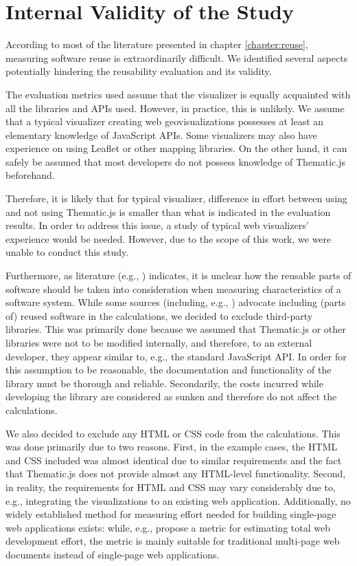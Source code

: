 \section{Internal Validity of the Study}
\label{section:internalvalidity}

According to most of the literature presented in chapter \ref{chapter:reuse}, measuring software reuse is extraordinarily difficult. We identified several aspects potentially hindering the reusability evaluation and its validity.

The evaluation metrics used assume that the visualizer is equally acquainted with all the libraries and APIs used. However, in practice, this is unlikely. We assume that a typical visualizer creating web geovisualizations possesses at least an elementary knowledge of JavaScript APIs. Some visualizers may also have experience on using Leaflet or other mapping libraries. On the other hand, it can safely be assumed that most developers do not possess knowledge of Thematic.js beforehand. 

Therefore, it is likely that for typical visualizer, difference in effort between using and not using Thematic.js is smaller than what is indicated in the evaluation results. In order to address this issue, a study of typical web visualizers' experience would be needed. However, due to the scope of this work, we were unable to conduct this study.

Furthermore, as literature (e.g., \citealt{frakes_success_1994,mohagheghi_quality_2007}) indicates, it is unclear how the reusable parts of software should be taken into consideration when measuring characteristics of a software system. While some sources (including, e.g., \citealt{frakes_software_1996,selby_enabling_2005}) advocate including (parts of) reused software in the calculations, we decided to exclude third-party libraries. This was primarily done because we assumed that Thematic.js or other libraries were not to be modified internally, and therefore, to an external developer, they appear similar to, e.g., the standard JavaScript API. In order for this assumption to be reasonable, the documentation and functionality of the library must be thorough and reliable. Secondarily, the costs incurred while developing the library are considered as sunken and therefore do not affect the calculations.

We also decided to exclude any HTML or CSS code from the calculations. This was done primarily due to two reasons. First, in the example cases, the HTML and CSS included was almost identical due to similar requirements and the fact that Thematic.js does not provide almost any HTML-level functionality. Second, in reality, the requirements for HTML and CSS may vary considerably due to, e.g., integrating the visualizations to an existing web application. Additionally, no widely established method for measuring effort needed for building single-page web applications exists: while, e.g., \citet{mendes_web_2001} propose a metric for estimating total web development effort, the metric is mainly suitable for traditional multi-page web documents instead of single-page web applications.

